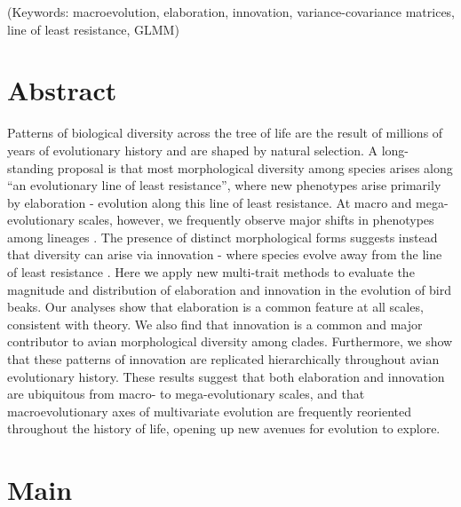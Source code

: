 \documentclass[12pt,letterpaper]{article}
\begin{document}




\noindent (Keywords: macroevolution, elaboration, innovation, variance-covariance matrices, line of least resistance, GLMM)\\

\section{Abstract}

Patterns of biological diversity across the tree of life are the result of millions of years of evolutionary history and are shaped by natural selection.
A long-standing proposal is that most morphological diversity among species arises along ``an evolutionary line of least resistance'', where new phenotypes arise primarily by elaboration - evolution along this line of least resistance.
At macro and mega-evolutionary scales, however, we frequently observe major shifts in phenotypes among lineages \cite{venditti2011multiple, pagel2022general}.
The presence of distinct morphological forms suggests instead that diversity can arise via innovation - where species evolve away from the line of least resistance \cite{endler2005animal, renaud2006conserved}.
Here we apply new multi-trait methods to evaluate the magnitude and distribution of elaboration and innovation in the evolution of bird beaks.
Our analyses show that elaboration is a common feature at all scales, consistent with theory.
We also find that innovation is a common and major contributor to avian morphological diversity among clades.
Furthermore, we show that these patterns of innovation are replicated hierarchically throughout avian evolutionary history.
These results suggest that both elaboration and innovation are ubiquitous from macro- to mega-evolutionary scales, and that macroevolutionary axes of multivariate evolution are frequently reoriented throughout the history of life, opening up new avenues for evolution to explore.

\section{Main}
\end{document}
